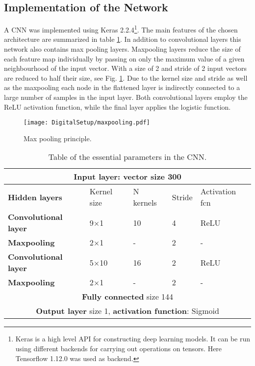 \documentclass[main.tex]{subfiles}
\begin{document}
\subsection{Implementation of the Network}
A CNN was implemented using Keras 2.2.4\footnote{Keras is a high level API for constructing deep learning models. It can be run using different backends for carrying out operations on tensors. Here Tensorflow 1.12.0 was used as backend.}\cite{keras}. The main features of the chosen architecture are summarized in table \ref{tab:architecture}. In addition to convolutional layers this network also contains max pooling layers. Maxpooling layers reduce the size of each feature map individually by passing on only the maximum value of a given neighbourhood of the input vector. With a size of 2 and stride of 2 input vectors are reduced to half their size, see Fig. \ref{fig:maxpooking}. Due to the kernel size and stride as well as the maxpooling each node in the flattened layer is indirectly connected to a large number of samples in the input layer. Both convolutional layers employ the ReLU activation function, while the final layer applies the logistic function.
\begin{figure}[ht!]
    \centering
        \texttt{[image: DigitalSetup/maxpooling.pdf]}
        \caption[Max pooling principle]{Max pooling principle.}
    \label{fig:maxpooking} 
\end{figure}

\begin{table}[h]
\center
\begin{tabular}{|l|l|l|l|l|}
\hline
\multicolumn{5}{|c|}{\textbf{Input layer}: vector size 300}                                            \\ \hline
\textbf{Hidden layers}       & Kernel size & N kernels & Stride & Activation fcn \\ \hline
\textbf{Convolutional layer} & 9$\times$1           & 10                & 4             & ReLU                \\ \hline
\textbf{Maxpooling}          & 2$\times$1           & -                 & 2             & -                   \\ \hline
\textbf{Convolutional layer} & 5$\times$10           & 16                & 2             & ReLU                \\ \hline
\textbf{Maxpooling}          & 2$\times$1           & -                 & 2             & -                   \\ \hline
\multicolumn{5}{|c|}{\textbf{Fully connected} size 144}
\\ \hline
\multicolumn{5}{|c|}{\textbf{Output layer} size 1, \textbf{activation function}: Sigmoid}               \\ \hline
\end{tabular}
\caption{Table of the essential parameters in the CNN.}
\label{tab:architecture}
\end{table}
\end{document}
